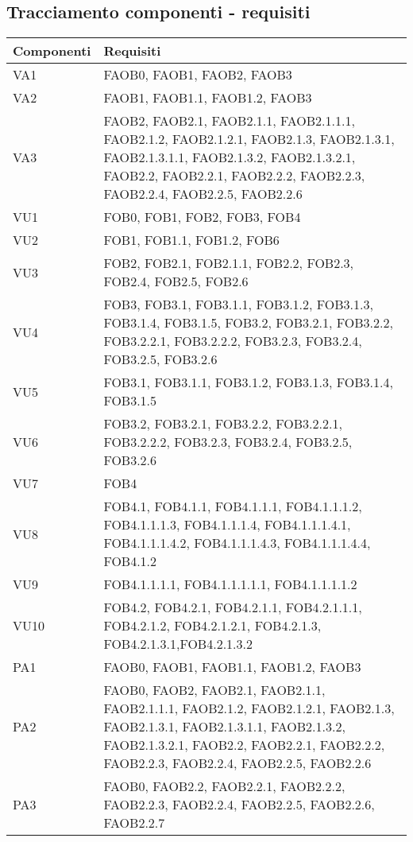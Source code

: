 {\subsection{Tracciamento componenti - requisiti}{
\begin{longtable}{p{} p{}}
\toprule
\textbf{Componenti}	&	\textbf{Requisiti}\\
\midrule
\midrule
VA1	& 	{FAOB0, FAOB1, FAOB2, FAOB3}\\
\midrule
VA2	&	{FAOB1, FAOB1.1, FAOB1.2, FAOB3}\\
\midrule
VA3	&	{FAOB2, FAOB2.1, FAOB2.1.1, FAOB2.1.1.1, FAOB2.1.2, FAOB2.1.2.1, FAOB2.1.3, FAOB2.1.3.1, FAOB2.1.3.1.1, FAOB2.1.3.2, FAOB2.1.3.2.1, FAOB2.2, FAOB2.2.1, FAOB2.2.2, FAOB2.2.3, FAOB2.2.4, FAOB2.2.5, FAOB2.2.6}\\
\midrule
VU1	&	{FOB0, FOB1, FOB2, FOB3, FOB4}\\
\midrule
VU2	&	{FOB1, FOB1.1, FOB1.2, FOB6}\\
\midrule
VU3	&	{FOB2, FOB2.1, FOB2.1.1, FOB2.2, FOB2.3, FOB2.4, FOB2.5, FOB2.6}\\
\midrule
VU4	&	{FOB3, FOB3.1, FOB3.1.1, FOB3.1.2, FOB3.1.3, FOB3.1.4, FOB3.1.5, FOB3.2, FOB3.2.1, FOB3.2.2, FOB3.2.2.1, FOB3.2.2.2, FOB3.2.3, FOB3.2.4, FOB3.2.5, FOB3.2.6}\\
\midrule
VU5	&	{FOB3.1, FOB3.1.1, FOB3.1.2, FOB3.1.3, FOB3.1.4, FOB3.1.5}\\
\midrule
VU6	&	{FOB3.2, FOB3.2.1, FOB3.2.2, FOB3.2.2.1, FOB3.2.2.2, FOB3.2.3, FOB3.2.4, FOB3.2.5, FOB3.2.6}\\
\midrule
VU7	&	{FOB4}\\
\midrule
VU8	&	{FOB4.1, FOB4.1.1, FOB4.1.1.1, FOB4.1.1.1.2, FOB4.1.1.1.3, FOB4.1.1.1.4, FOB4.1.1.1.4.1, FOB4.1.1.1.4.2, FOB4.1.1.1.4.3, FOB4.1.1.1.4.4, FOB4.1.2}\\
\midrule
VU9	&	{FOB4.1.1.1.1, FOB4.1.1.1.1.1, FOB4.1.1.1.1.2}\\
\midrule
VU10		&	{FOB4.2, FOB4.2.1, FOB4.2.1.1, FOB4.2.1.1.1, FOB4.2.1.2, FOB4.2.1.2.1, FOB4.2.1.3, FOB4.2.1.3.1,FOB4.2.1.3.2}\\
\midrule
PA1		&	{FAOB0, FAOB1, FAOB1.1, FAOB1.2, FAOB3}\\
\midrule
PA2		&	{FAOB0, FAOB2, FAOB2.1, FAOB2.1.1, FAOB2.1.1.1, FAOB2.1.2, FAOB2.1.2.1, FAOB2.1.3, FAOB2.1.3.1, FAOB2.1.3.1.1, FAOB2.1.3.2, FAOB2.1.3.2.1, FAOB2.2, FAOB2.2.1, FAOB2.2.2, FAOB2.2.3, FAOB2.2.4, FAOB2.2.5, FAOB2.2.6}\\
\midrule
PA3		&	{FAOB0, FAOB2.2, FAOB2.2.1, FAOB2.2.2, FAOB2.2.3, FAOB2.2.4, FAOB2.2.5, FAOB2.2.6, FAOB2.2.7}\\

\end{longtable}}}
